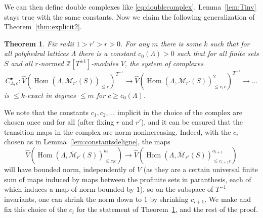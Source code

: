 \documentclass[11pt]{amsbook}
\DeclareMathOperator{\Hom}{Hom}
\numberwithin{equation}{section}
\newtheorem{theorem}{Theorem}
\numberwithin{theorem}{section}
\theoremstyle{definition}
\begin{document}
We can then define double complexes like \eqref{eq:doublecomplex}. Lemma~\ref{lem:Tinv} stays true with the same constants. Now we claim the following generalization of Theorem~\ref{thm:explicit2}.

\begin{theorem}\label{thm:explicit3} Fix radii $1>r'>r>0$. For any $m$ there is some $k$ such that for all polyhedral lattices $\Lambda$ there is a constant $c_0(\Lambda)>0$ such that for all finite sets $S$ and all $r$-normed $\mathbb Z[T^{\pm 1}]$-modules $V$, the system of complexes
\[
C_{\Lambda,c}^\bullet: \widehat{V}(\Hom(\Lambda,\overline{\mathcal M}_{r'}(S))_{\leq c})^{T^{-1}}\to \widehat{V}(\Hom(\Lambda,\overline{\mathcal M}_{r'}(S))_{\leq c_1c}^2)^{T^{-1}}\to \ldots
\]
is $\leq k$-exact in degrees $\leq m$ for $c\geq c_0(\Lambda)$.
\end{theorem}

We note that the constants $c_1,c_2,\ldots$ implicit in the choice of the complex are chosen once and for all (after fixing $r$ and $r'$), and it can be ensured that the transition maps in the complex are norm-nonincreasing. Indeed, with the $c_i$ chosen as in Lemma~\ref{lem:constantsdeligne}, the maps
\[
\widehat{V}(\Hom(\Lambda,\overline{\mathcal M}_{r'}(S))_{\leq c_ic}^{a_i})\to \widehat{V}(\Hom(\Lambda,\overline{\mathcal M}_{r'}(S))_{\leq c_{i+1}c}^{a_{i+1}})
\]
will have bounded norm, independently of $V$ (as they are a certain universal finite sum of maps induced by maps between the profinite sets in paranthesis, each of which induces a map of norm bounded by $1$), so on the subspace of $T^{-1}$-invariants, one can shrink the norm down to $1$ by shrinking $c_{i+1}$. We make and fix this choice of the $c_i$ for the statement of Theorem~\ref{thm:explicit3}, and the rest of the proof.
\end{document}
